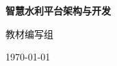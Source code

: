 \documentclass[12pt,a4paper]{book}
\begin{document}
\begin{titlepage}
\centering
{\Huge \textbf{智慧水利平台架构与开发}}
\vspace{2cm}

{\Large 教材编写组}
\vspace{1cm}

{\large \today}
\end{titlepage}

\frontmatter
\tableofcontents
\listoffigures
\listoftables

\mainmatter












\backmatter
\end{document}
